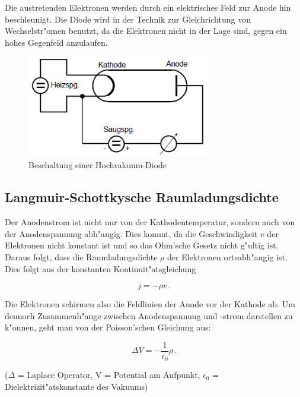 Die austretenden Elektronen werden durch ein elektrisches Feld zur Anode hin beschleunigt. Die Diode wird in der Technik zur Gleichrichtung von Wechselstr"omen benutzt, da die Elektronen nicht in der Lage sind, gegen ein hohes Gegenfeld anzulaufen.

\begin{figure}[!h]
	\centering
	\includegraphics[width = 8cm]{img/Diode.PNG}
	\caption{Beschaltung einer Hochvakuum-Diode}
	\label{diode}
\end{figure}

\subsection{Langmuir-Schottkysche Raumladungsdichte} %
\label{sub:langmuir_schottkysche_raumladungsdichte}

Der Anodenstrom ist nicht nur von der Kathodentemperatur, sondern auch von der Anodenspannung abh"angig. Dies kommt, da die Geschwindigkeit $v$ der Elektronen nicht konstant ist und so das Ohm'sche Gesetz nicht g"ultig ist.
Daraus folgt, dass die Raumladungsdichte $\rho$ der Elektronen ortsabh"angig ist.
Dies folgt aus der konstanten Kontinuit"atsgleichung

\begin{equation}
	j = - \rho v \, .
\end{equation}

Die Elektronen schirmen also die Feldlinien der Anode vor der Kathode ab.
Um dennoch Zusammenh"ange zwischen Anodenspannung und -strom darstellen zu k"onnen, geht man von der Poisson'schen Gleichung aus:

\begin{equation}
	\Delta V = - \frac{1}{\epsilon_\mathrm{0}} \rho \, .	
\end{equation}

\begin{center}
		\tiny{($\Delta$ = Laplace Operator, V = Potential am Aufpunkt, $\epsilon_\mathrm{0}$ = Dielektrizit"atskonstante des Vakuums)}
\end{center}

